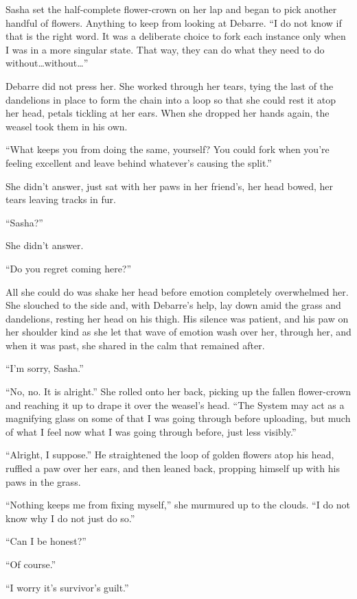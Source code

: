 Sasha set the half-complete flower-crown on her lap and began to pick another handful of flowers. Anything to keep from looking at Debarre. ``I do not know if that is the right word. It was a deliberate choice to fork each instance only when I was in a more singular state. That way, they can do what they need to do without\ldots without\ldots{}''

Debarre did not press her. She worked through her tears, tying the last of the dandelions in place to form the chain into a loop so that she could rest it atop her head, petals tickling at her ears. When she dropped her hands again, the weasel took them in his own.

``What keeps you from doing the same, yourself? You could fork when you're feeling excellent and leave behind whatever's causing the split.''

She didn't answer, just sat with her paws in her friend's, her head bowed, her tears leaving tracks in fur.

``Sasha?''

She didn't answer.

``Do you regret coming here?''

All she could do was shake her head before emotion completely overwhelmed her. She slouched to the side and, with Debarre's help, lay down amid the grass and dandelions, resting her head on his thigh. His silence was patient, and his paw on her shoulder kind as she let that wave of emotion wash over her, through her, and when it was past, she shared in the calm that remained after.

``I'm sorry, Sasha.''

``No, no. It is alright.'' She rolled onto her back, picking up the fallen flower-crown and reaching it up to drape it over the weasel's head. ``The System may act as a magnifying glass on some of that I was going through before uploading, but much of what I feel now what I was going through before, just less visibly.''

``Alright, I suppose.'' He straightened the loop of golden flowers atop his head, ruffled a paw over her ears, and then leaned back, propping himself up with his paws in the grass.

``Nothing keeps me from fixing myself,'' she murmured up to the clouds. ``I do not know why I do not just do so.''

``Can I be honest?''

``Of course.''

``I worry it's survivor's guilt.''

